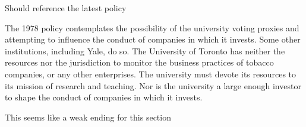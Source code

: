 \begin{vcom}
	Should reference the latest policy
\end{vcom}

The 1978 policy contemplates the possibility of the university voting proxies and attempting to influence the conduct of companies in which it invests. 
Some other institutions, including Yale, do so. 
The University of Toronto has neither the resources nor the jurisdiction to monitor the business practices of tobacco companies, or any other enterprises. 
The university must devote its resources to its mission of research and teaching. 
Nor is the university a large enough investor to shape the conduct of companies in which it invests. 

\begin{vcom}
	This seems like a weak ending for this section
\end{vcom}


